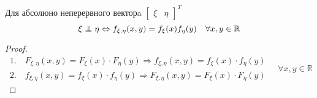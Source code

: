 \begin{boxteo}Для абсолюно неперервного векторa $\begin{bmatrix}
	 \xi& \eta
	\end{bmatrix}^T$\\
$$\xi \independent \eta \Leftrightarrow f_{\xi, \eta} (x,y)= f_{\xi}(x) f_{\eta}(y) \quad \forall x,y \in \mathbb{R}$$
\end{boxteo}

\begin{proof}
$$
\begin{gathered}
1. \quad  F_{\xi, \eta} (x,y) = F_{\xi}(x) \cdot F_{\eta}(y) \Longrightarrow f_{\xi, \eta} (x,y) = f_{\xi}(x) \cdot f_{\eta}(y)\\
	2. \quad f_{\xi, \eta} (x,y) = f_{\xi}(x) \cdot f_{\eta}(y)\Longrightarrow F_{\xi, \eta} (x,y) = F_{\xi}(x) \cdot F_{\eta}(y)
\end{gathered}\quad \forall x,y \in \mathbb{R}
$$
\end{proof}
